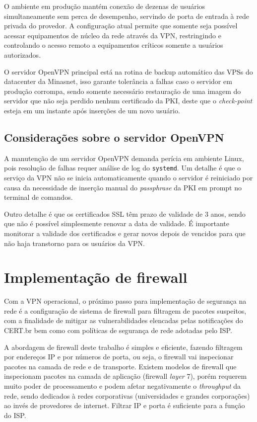     O ambiente em produção mantém conexão de dezenas de usuários simultaneamente sem perca de desempenho, servindo de porta de entrada à rede privada do provedor. A configuração atual permite que somente seja possível acessar equipamentos de núcleo da rede através da VPN, restringindo e controlando o acesso remoto a equipamentos críticos somente a usuários autorizados.
    
    O servidor OpenVPN principal está na rotina de backup automático das VPSs do datacenter da Minasnet, isso garante tolerância a falhas caso o servidor em produção corrompa, sendo somente necessário restauração de uma imagem do servidor que não seja perdido nenhum certificado da PKI, deste que o \textit{check-point} esteja em um instante após inserções de um novo usuário.
    
\subsection{Considerações sobre o servidor OpenVPN}

    A manutenção de um servidor OpenVPN demanda perícia em ambiente Linux, pois resolução de falhas requer análise de log do {\tt systemd}. Um detalhe é que o serviço da VPN não se inicia automaticamente quando o servidor é reiniciado por causa da necessidade de inserção manual do \textit{passphrase} da PKI em prompt no terminal de comandos.
    
    Outro detalhe é que os certificados SSL têm prazo de validade de 3 anos, sendo que não é possível simplesmente renovar a data de validade. É importante monitorar a validade dos certificados e gerar novos depois de vencidos para que não haja transtorno para os usuários da VPN.
    
\section{Implementação de firewall}

    Com a VPN operacional, o próximo passo para implementação de segurança na rede é a configuração de sistema de firewall para filtragem de pacotes suspeitos, com a finalidade de mitigar as vulnerabilidades elencadas pelas notificações do CERT.br bem como com políticas de segurança de rede adotadas pelo ISP.
    
    A abordagem de firewall deste trabalho é simples e eficiente, fazendo filtragem por endereços IP e por números de porta, ou seja, o firewall vai inspecionar pacotes na camada de rede e de transporte. Existem modelos de firewall que inspecionam pacotes na camada de aplicação (firewall \textit{layer} 7), porém requerem muito poder de processamento e podem afetar negativamente o \textit{throughput} da rede, sendo dedicados à redes corporativas (universidades e grandes corporações) ao invés de provedores de internet. Filtrar IP e porta é suficiente para a função do ISP.
    
